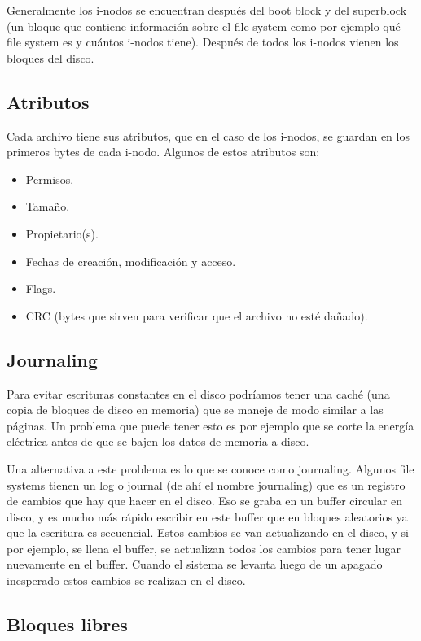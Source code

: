 \documentclass{article}
\begin{document}
Generalmente los i-nodos se encuentran despu\'es del boot block y del superblock (un bloque que contiene informaci\'on sobre el file system como por ejemplo qu\'e file system es y cu\'antos i-nodos tiene). Despu\'es de todos los i-nodos vienen los bloques del disco.

\subsection{Atributos}

Cada archivo tiene sus atributos, que en el caso de los i-nodos, se guardan en los primeros bytes de cada i-nodo. Algunos de estos atributos son:

\begin{itemize}
\item Permisos.
\item Tama\~no.
\item Propietario(s).
\item Fechas de creaci\'on, modificaci\'on y acceso.
\item Flags.
\item CRC (bytes que sirven para verificar que el archivo no est\'e da\~nado).
\end{itemize}

\subsection{Journaling}

Para evitar escrituras constantes en el disco podr\'iamos tener una cach\'e (una copia de bloques de disco en memoria) que se maneje de modo similar a las p\'aginas. Un problema que puede tener esto es por ejemplo que se corte la energ\'ia el\'ectrica antes de que se bajen los datos de memoria a disco.

Una alternativa a este problema es lo que se conoce como journaling. Algunos file systems tienen un log o journal (de ah\'i el nombre journaling) que es un registro de cambios que hay que hacer en el disco. Eso se graba en un buffer circular en disco, y es mucho m\'as r\'apido escribir en este buffer que en bloques aleatorios ya que la escritura es secuencial. Estos cambios se van actualizando en el disco, y si por ejemplo, se llena el buffer, se actualizan todos los cambios para tener lugar nuevamente en el buffer. Cuando el sistema se levanta luego de un apagado inesperado estos cambios se realizan en el disco.

\subsection{Bloques libres}
\end{document}
